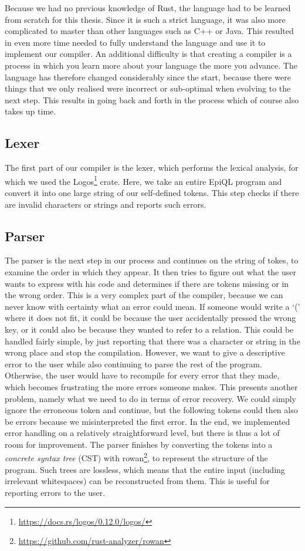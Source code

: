 Because we had no previous knowledge of Rust, the language had to be learned from scratch for this thesis. Since it is such a strict language, it was also more complicated to master than other languages such as C++ or Java. This resulted in even more time needed to fully understand the language and use it to implement our compiler. An additional difficulty is that creating a compiler is a process in which you learn more about your language the more you advance. The language has therefore changed considerably since the start, because there were things that we only realised were incorrect or sub-optimal when evolving to the next step. This results in going back and forth in the process which of course also takes up time.

\subsection{Lexer}
\label{subsec:lexer}
The first part of our compiler is the lexer, which performs the lexical analysis, for which we used the Logos\footnote{\url{https://docs.rs/logos/0.12.0/logos/}} crate. Here, we take an entire EpiQL program and convert it into one large string of our self-defined tokens. This step checks if there are invalid characters or strings and reports such errors.

\subsection{Parser}
\label{subsec:parser}
The parser is the next step in our process and continues on the string of tokes, to examine the order in which they appear. It then tries to figure out what the user wants to express with his code and determines if there are tokens missing or in the wrong order. This is a very complex part of the compiler, because we can never know with certainty what an error could mean. If someone would write a `(' where it does not fit, it could be because the user accidentally pressed the wrong key, or it could also be because they wanted to refer to a relation. This could be handled fairly simple, by just reporting that there was a character or string in the wrong place and stop the compilation. However, we want to give a descriptive error to the user while also continuing to parse the rest of the program. Otherwise, the user would have to recompile for every error that they made, which becomes frustrating the more errors someone makes. This presents another problem, namely what we need to do in terms of error recovery. We could simply ignore the erroneous token and continue, but the following tokens could then also be errors because we misinterpreted the first error. In the end, we implemented error handling on a relatively straightforward level, but there is thus a lot of room for improvement. The parser finishes by converting the tokens into a \textit{concrete syntax tree} (CST) with rowan\footnote{\url{https://github.com/rust-analyzer/rowan}}, to represent the structure of the program. Such trees are lossless, which means that the entire input (including irrelevant whitespaces) can be reconstructed from them. This is useful for reporting errors to the user.

